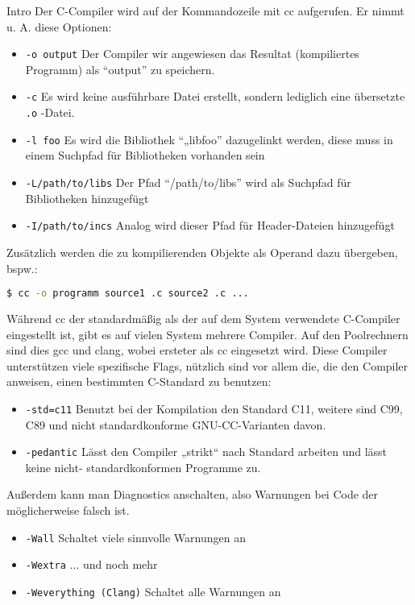 \documentclass[paper=a4,fontsize=11pt]{scrartcl}%
\numberwithin{equation}{section}
\begin{document}
\Large{Intro}
Der C-Compiler wird auf der Kommandozeile mit cc aufgerufen. Er nimmt u. A. diese Optionen:
\begin{itemize}
	\item \texttt{-o output} Der Compiler wir angewiesen das Resultat (kompiliertes Programm) als \enquote{output} zu speichern.
	\item \texttt{-c} Es wird keine ausführbare Datei erstellt, sondern lediglich eine übersetzte \texttt{.o} -Datei.
	\item \texttt{-l foo} Es wird die Bibliothek \enquote{„libfoo} dazugelinkt werden, diese muss in einem Suchpfad für Bibliotheken vorhanden sein
	\item \texttt{-L/path/to/libs} Der Pfad \enquote{/path/to/libs} wird als Suchpfad für Bibliotheken hinzugefügt
	\item \texttt{-I/path/to/incs} Analog wird dieser Pfad für Header-Dateien hinzugefügt 
\end{itemize}
Zusätzlich werden die zu kompilierenden Objekte als Operand dazu übergeben, bspw.:
\begin{lstlisting}[style=Bash, language=Bash]
$ cc -o programm source1 .c source2 .c ...
\end{lstlisting}
Während cc der standardmäßig als der auf dem System verwendete C-Compiler eingestellt ist, gibt es auf vielen System mehrere Compiler. Auf den Poolrechnern sind dies gcc und clang, wobei ersteter als cc eingesetzt wird.
Diese Compiler unterstützen viele spezifische Flags, nützlich sind vor allem die, die den Compiler anweisen, einen bestimmten C-Standard zu benutzen:
\begin{itemize}
	\item \texttt{-std=c11} Benutzt bei der Kompilation den Standard C11, weitere sind C99, C89 und
nicht standardkonforme GNU-CC-Varianten davon.
	\item \texttt{-pedantic} Lässt den Compiler „strikt“ nach Standard arbeiten und lässt keine nicht-
standardkonformen Programme zu.
\end{itemize}
Außerdem kann man Diagnostics anschalten, also Warnungen bei Code der möglicherweise falsch ist.
\begin{itemize}
	\item \texttt{-Wall} Schaltet viele sinnvolle Warnungen an
	\item \texttt{-Wextra} $\ldots$ und noch mehr
	\item \texttt{-Weverything (Clang)} Schaltet alle Warnungen an
\end{itemize}
\end{document}
